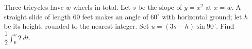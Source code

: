 Three tricycles have $w$ wheels in total. Let $s$ be the slope of $y=x^2$ at $x=w$. A straight slide of length $60$ feet makes an angle of $60^\circ$ with horizontal ground; let $h$ be its height, rounded to the nearest integer. Set $u=(3s-h)\sin90^\circ$. Find $\dfrac{1}{2}\int_0^u2\,dt$.
